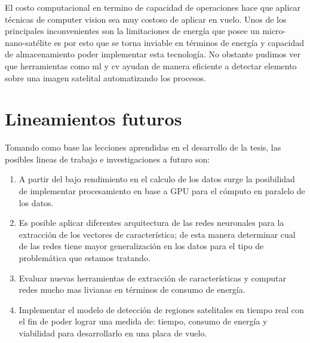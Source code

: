El costo computacional en termino de capacidad de operaciones hace que aplicar técnicas de computer vision sea  muy costoso de aplicar en vuelo. Unos de los principales inconvenientes son la limitaciones de energía que posee un micro-nano-satélite es por esto que se torna inviable en términos de energía y capacidad de almacenamiento poder implementar esta tecnología. No obstante pudimos ver que herramientas como \ac{ml} y \ac{cv} ayudan de manera eficiente a detectar elemento sobre una imagen satelital automatizando los procesos.


\section{Lineamientos futuros}\label{lineafuturas}
Tomando como base las lecciones aprendidas en el desarrollo de la tesis, las posibles lineas de trabajo e investigaciones a futuro son:
\begin{enumerate}
 \item A partir del bajo rendimiento en el calculo de los datos surge la posibilidad de implementar procesamiento en base a GPU para el cómputo en paralelo de los datos.
 \item Es posible aplicar diferentes arquitectura de las redes neuronales para la extracción de los vectores de característica; de esta manera determinar cual de las redes tiene mayor generalización en los datos para el tipo de problemática que estamos tratando.
 \item Evaluar nuevas herramientas de extracción de características y computar redes mucho mas livianas en términos de consumo de energía.
\item Implementar el modelo de detección de regiones satelitales en tiempo real con el fin de poder lograr una medida de: tiempo, consumo de energía y viabilidad para desarrollarlo en una placa de vuelo. 
\end{enumerate}